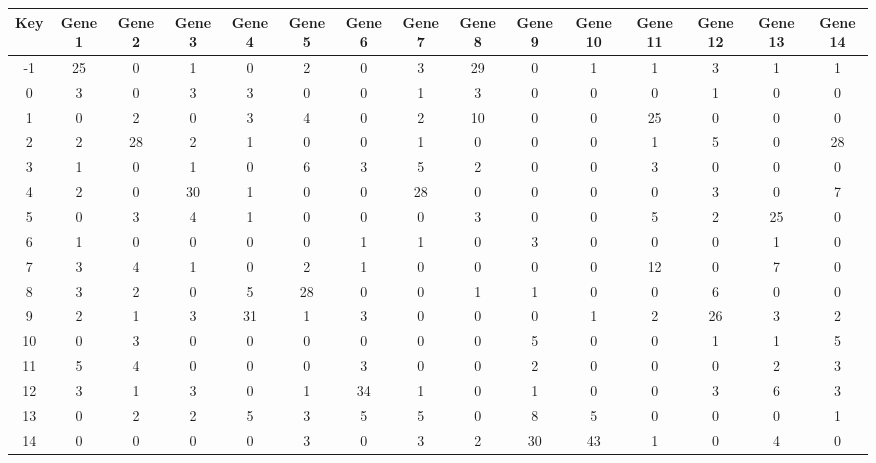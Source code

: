 \begin{tabular}{|c|c|c|c|c|c|c|c|c|c|c|c|c|c|c|}
\hline
Key & Gene 1 & Gene 2 & Gene 3 & Gene 4 & Gene 5 & Gene 6 & Gene 7 & Gene 8 & Gene 9 & Gene 10 & Gene 11 & Gene 12 & Gene 13 & Gene 14 \\
\hline
-1 & 25 & 0 & 1 & 0 & 2 & 0 & 3 & 29 & 0 & 1 & 1 & 3 & 1 & 1 \\
0 & 3 & 0 & 3 & 3 & 0 & 0 & 1 & 3 & 0 & 0 & 0 & 1 & 0 & 0 \\
1 & 0 & 2 & 0 & 3 & 4 & 0 & 2 & 10 & 0 & 0 & 25 & 0 & 0 & 0 \\
2 & 2 & 28 & 2 & 1 & 0 & 0 & 1 & 0 & 0 & 0 & 1 & 5 & 0 & 28 \\
3 & 1 & 0 & 1 & 0 & 6 & 3 & 5 & 2 & 0 & 0 & 3 & 0 & 0 & 0 \\
4 & 2 & 0 & 30 & 1 & 0 & 0 & 28 & 0 & 0 & 0 & 0 & 3 & 0 & 7 \\
5 & 0 & 3 & 4 & 1 & 0 & 0 & 0 & 3 & 0 & 0 & 5 & 2 & 25 & 0 \\
6 & 1 & 0 & 0 & 0 & 0 & 1 & 1 & 0 & 3 & 0 & 0 & 0 & 1 & 0 \\
7 & 3 & 4 & 1 & 0 & 2 & 1 & 0 & 0 & 0 & 0 & 12 & 0 & 7 & 0 \\
8 & 3 & 2 & 0 & 5 & 28 & 0 & 0 & 1 & 1 & 0 & 0 & 6 & 0 & 0 \\
9 & 2 & 1 & 3 & 31 & 1 & 3 & 0 & 0 & 0 & 1 & 2 & 26 & 3 & 2 \\
10 & 0 & 3 & 0 & 0 & 0 & 0 & 0 & 0 & 5 & 0 & 0 & 1 & 1 & 5 \\
11 & 5 & 4 & 0 & 0 & 0 & 3 & 0 & 0 & 2 & 0 & 0 & 0 & 2 & 3 \\
12 & 3 & 1 & 3 & 0 & 1 & 34 & 1 & 0 & 1 & 0 & 0 & 3 & 6 & 3 \\
13 & 0 & 2 & 2 & 5 & 3 & 5 & 5 & 0 & 8 & 5 & 0 & 0 & 0 & 1 \\
14 & 0 & 0 & 0 & 0 & 3 & 0 & 3 & 2 & 30 & 43 & 1 & 0 & 4 & 0 \\
\hline
\end{tabular}
